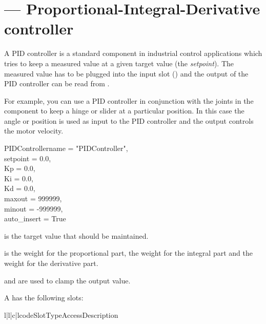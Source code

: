 
\section{ ---
         Proportional-Integral-Derivative controller}

A PID controller is a standard component in industrial control
applications which tries to keep a measured value at a given target
value (the {\em setpoint}). The measured value has to be plugged into
the input slot () and the output of the PID controller
can be read from .


For example, you can use a PID controller in conjunction with the
joints in the  component to keep a hinge or slider
at a particular position. In this case the angle or position is used
as input to the PID controller and the output controls the motor velocity.

\begin{classdesc}{PIDController}{name = "PIDController",\\ 
                              setpoint = 0.0, \\
                              Kp = 0.0, \\
                              Ki = 0.0, \\
                              Kd = 0.0, \\
                              maxout = 999999, \\
                              minout = -999999, \\
                              auto_insert = True}

 is the target value that should be maintained.

 is the weight for the proportional part,  the weight
for the integral part and  the weight for the derivative part.

 and  are used to clamp the output value.
\end{classdesc}

A  has the following slots:

\begin{tableiv}{l|l|c|l}{code}{Slot}{Type}{Access}{Description}
\end{tableiv}



